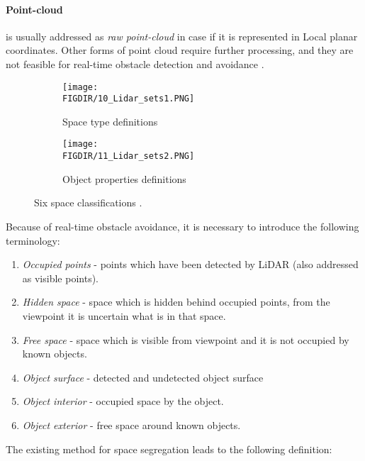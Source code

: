 \paragraph{Point-cloud} is usually addressed as \textit{raw point-cloud} in case if it is represented in Local planar coordinates. Other forms of point cloud require further processing, and they are not feasible for real-time obstacle detection and avoidance \cite{chen2007airborne}.

\begin{figure}[H]
    
    \begin{subfigure}{0.45\textwidth}
        \centering
        \texttt{[image: \\FIGDIR/10\_Lidar\_sets1.PNG]} 
        \caption{Space type definitions}
        \label{fig:Spacetypes}
    \end{subfigure}
    \begin{subfigure}{0.45\textwidth}
        \centering
        \texttt{[image: \\FIGDIR/11\_Lidar\_sets2.PNG]}
        \caption{Object properties definitions}
        \label{fig:ObectProperties}
    \end{subfigure}
    
    \caption{Six space classifications \cite{yapo2008probabilistic}.}
    \label{fig:Spaces of interests}
 \end{figure}

\newpage 
\noindent  Because of real-time obstacle avoidance, it is necessary to introduce the following terminology:
\begin{enumerate}
    \item \textit{Occupied points} - points which have been detected by LiDAR (also addressed as visible points).
    \item \textit{Hidden space} - space which is hidden behind occupied points, from the viewpoint it is uncertain what is in that space. 
    \item \textit{Free space} - space which is visible from viewpoint and it is not occupied by known objects.
    \item \textit{Object surface} - detected and undetected object surface
    \item \textit{Object interior} - occupied space by the object.
    \item \textit{Object exterior} - free space around known objects.
\end{enumerate}

\noindent The existing method for space segregation \cite{yapo2008probabilistic} leads to the following definition:

